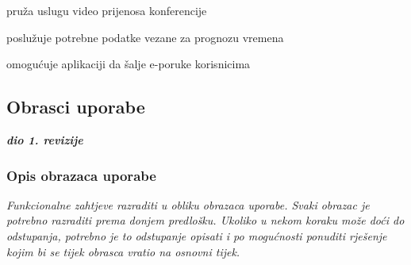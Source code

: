 \begin{packed_enum}
\begin{packed_enum}
					\item pruža uslugu video prijenosa konferencije
				
				\end{packed_enum}
				
				\item {}
				
				\begin{packed_enum}
					
					\item poslužuje potrebne podatke vezane za prognozu vremena
					
				\end{packed_enum}
				
				\item {}
				
				\begin{packed_enum}
					
					\item omogućuje aplikaciji da šalje e-poruke korisnicima
					
				\end{packed_enum}
				
			\end{packed_enum}
			
			\eject 
			
			
				
			\subsection{Obrasci uporabe}
				
				\textbf{\textit{dio 1. revizije}}
				
				\subsubsection{Opis obrazaca uporabe}
					\textit{Funkcionalne zahtjeve razraditi u obliku obrazaca uporabe. Svaki obrazac je potrebno razraditi prema donjem predlošku. Ukoliko u nekom koraku može doći do odstupanja, potrebno je to odstupanje opisati i po mogućnosti ponuditi rješenje kojim bi se tijek obrasca vratio na osnovni tijek.}\\
					
					\setcounter{UseCaseCounter}{1}
					
